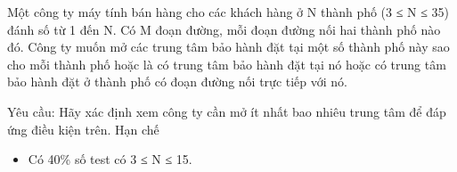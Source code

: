Một công ty máy tính bán hàng cho các khách hàng ở N thành phố (3 ≤ N ≤ 35) đánh số từ 1 đến N. Có M đoạn đường, mỗi đoạn đường nối hai thành phố nào đó. Công ty muốn mở các trung tâm bảo hành đặt tại một số thành phố này sao cho mỗi thành phố hoặc là có trung tâm bảo hành đặt tại nó hoặc có trung tâm bảo hành đặt ở thành phố có đoạn đường nối trực tiếp với nó.  

   Yêu cầu: Hãy xác định xem công ty cần mở ít nhất bao nhiêu trung tâm để đáp ứng điều kiện trên.
   Hạn chế  
\begin{itemize}
	\item     Có 40\% số test có 3 ≤ N ≤ 15.   
\end{itemize}
